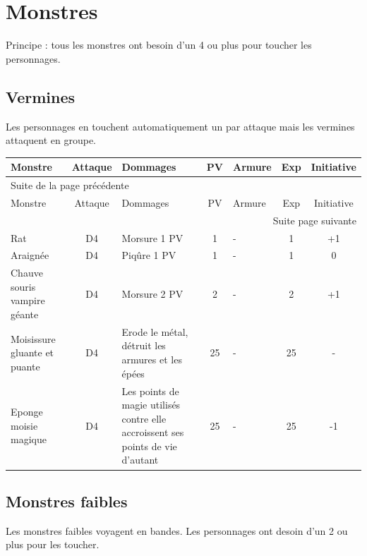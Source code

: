 \documentclass[a4paper, 11pt, twoside]{article}
\begin{document}
\section{Monstres}
\label{sec:org4bbfbb7}

Principe : tous les monstres ont besoin d'un 4 ou plus pour toucher les personnages.

\subsection{Vermines}
\label{sec:org3134737}

Les personnages en touchent automatiquement un par attaque mais les vermines attaquent en groupe.

\begin{longtable}{p{3cm}|c|p{6cm}|c|p{1.3cm}|c|c}
Monstre & Attaque & Dommages & PV & Armure & Exp & Initiative\\
\hline
\endfirsthead
\multicolumn{7}{l}{Suite de la page précédente} \\
\hline

Monstre & Attaque & Dommages & PV & Armure & Exp & Initiative \\

\hline
\endhead
\hline\multicolumn{7}{r}{Suite page suivante} \\
\endfoot
\endlastfoot
\hline
Rat & D4 & Morsure 1 PV & 1 & - & 1 & +1\\
\hline
Araignée & D4 & Piqûre 1 PV & 1 & - & 1 & 0\\
\hline
Chauve souris vampire géante & D4 & Morsure 2 PV & 2 & - & 2 & +1\\
\hline
Moisissure gluante et puante & D4 & Erode le métal, détruit les armures et les épées & 25 & - & 25 & -\\
\hline
Eponge moisie magique & D4 & Les points de magie utilisés contre elle accroissent ses points de vie d'autant & 25 & - & 25 & -1\\
\end{longtable}

\newpage

\subsection{Monstres faibles}
\label{sec:org90bb888}

Les monstres faibles voyagent en bandes. Les personnages ont desoin d'un 2 ou plus pour les toucher.
\end{document}
